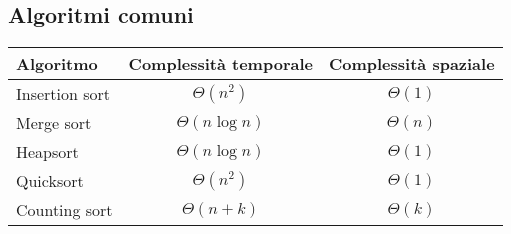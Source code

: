 \subsection*{Algoritmi comuni}

\begin{center}
    \begin{tabular}{|l|c|c|}
        \hline
        \textbf{Algoritmo} & \textbf{Complessità temporale} & \textbf{Complessità spaziale} \\
        \hline
        Insertion sort & $\Theta(n^2)$ & $\Theta(1)$ \\
        \hline
        Merge sort & $\Theta(n \log n)$ & $\Theta(n)$ \\
        \hline
        Heapsort & $\Theta(n \log n)$ & $\Theta(1)$ \\
        \hline
        Quicksort & $\Theta(n^2)$ & $\Theta(1)$ \\
        \hline
        Counting sort & $\Theta(n+k)$ & $\Theta(k)$ \\
        \hline
    \end{tabular}
\end{center}